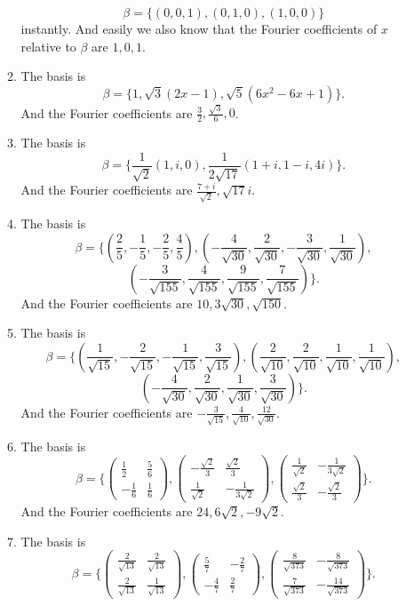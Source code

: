 \begin{enumerate}
\begin{enumerate}
\[\beta =\{(0,0,1),(0,1,0),(1,0,0)\}\]
instantly. And easily we also know that the Fourier coefficients of $x$ relative to $\beta $ are $1,0,1$.
\item The basis is 
\[\beta=\{1,\sqrt{3}(2x-1),\sqrt{5}(6x^2-6x+1)\}.\]
And the Fourier coefficients are $\frac{3}{2},\frac{\sqrt{3}}{6},0$.
\item The basis is 
\[\beta=\{\frac{1}{\sqrt{2}}(1,i,0),\frac{1}{2\sqrt{17}}(1+i,1-i,4i)\}.\]
And the Fourier coefficients are $\frac{7+i}{\sqrt{2}},\sqrt{17}i$.
\item The basis is 
\[\beta=\{(\frac{2}{5},-\frac{1}{5},-\frac{2}{5},\frac{4}{5}),(-\frac{4}{\sqrt{30}},\frac{2}{\sqrt{30}},-\frac{3}{\sqrt{30}},\frac{1}{\sqrt{30}}),\]
\[(-\frac{3}{\sqrt{155}},\frac{4}{\sqrt{155}},\frac{9}{\sqrt{155}},\frac{7}{\sqrt{155}})\}.\]
And the Fourier coefficients are $10,3\sqrt{30},\sqrt{150}$.
\item The basis is 
\[\beta=\{(\frac{1}{\sqrt{15}},-\frac{2}{\sqrt{15}},-\frac{1}{\sqrt{15}},\frac{3}{\sqrt{15}}),(\frac{2}{\sqrt{10}},\frac{2}{\sqrt{10}},\frac{1}{\sqrt{10}},\frac{1}{\sqrt{10}}),\]
\[(-\frac{4}{\sqrt{30}},\frac{2}{\sqrt{30}},\frac{1}{\sqrt{30}},\frac{3}{\sqrt{30}})\}.\]
And the Fourier coefficients are $-\frac{3}{\sqrt{15}},\frac{4}{\sqrt{10}},\frac{12}{\sqrt{30}}$.
\item The basis is 
\[\beta=\{\begin{pmatrix}\frac{1}{2}&\frac{5}{6}\\-\frac{1}{6}&\frac{1}{6}\end{pmatrix},\begin{pmatrix}-\frac{\sqrt{2}}{3}&\frac{\sqrt{2}}{3}\\\frac{1}{\sqrt{2}}&-\frac{1}{3\sqrt{2}}\end{pmatrix},\begin{pmatrix}\frac{1}{\sqrt{2}}&-\frac{1}{3\sqrt{2}}\\\frac{\sqrt{2}}{3}&-\frac{\sqrt{2}}{3}\end{pmatrix}\}.\]
And the Fourier coefficients are $24,6\sqrt{2},-9\sqrt{2}$.
\item The basis is 
\[\beta=\{\begin{pmatrix}\frac{2}{\sqrt{13}}&\frac{2}{\sqrt{13}}\\\frac{2}{\sqrt{13}}&\frac{1}{\sqrt{13}}\end{pmatrix},\begin{pmatrix}\frac{5}{7}&-\frac{2}{7}\\-\frac{4}{7}&\frac{2}{7}\end{pmatrix},\begin{pmatrix}\frac{8}{\sqrt{373}}&-\frac{8}{\sqrt{373}}\\\frac{7}{\sqrt{373}}&-\frac{14}{\sqrt{373}}\end{pmatrix}\}.\]

\end{enumerate}
\end{enumerate}
